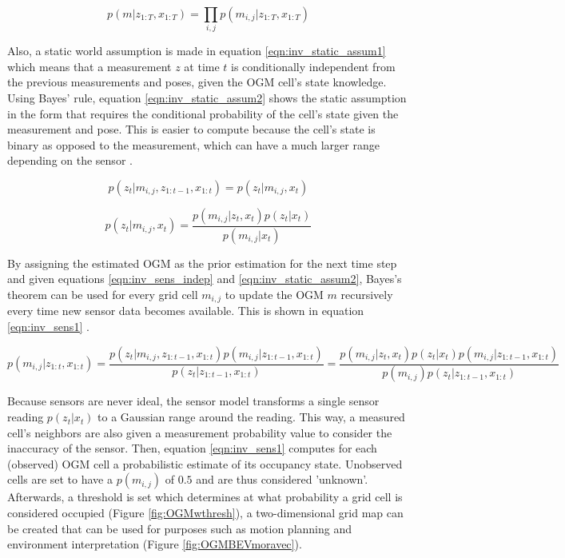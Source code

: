 \begin{equation} \label{eqn:inv_sens_indep}
	p(m|z_{1:T},x_{1:T}) = \prod_{i,j}^{} p(m_{i,j}|z_{1:T},x_{1:T}) 
\end{equation} 

Also, a static world assumption is made in equation \ref{eqn:inv_static_assum1} which means that a measurement $z$ at time $t$ is conditionally independent from the previous measurements and poses, given the \gls{OGM} cell's state knowledge. Using Bayes' rule, equation \ref{eqn:inv_static_assum2} shows the static assumption in the form that requires the conditional probability of the cell's state given the measurement and pose. This is easier to compute because the cell's state is binary as opposed to the measurement, which can have a much larger range depending on the sensor \cite{carvalho2013comparative}. 

\begin{equation} \label{eqn:inv_static_assum1}
	p(z_t|m_{i,j}, z_{1:t-1}, x_{1:t}) = p(z_t|m_{i,j}, x_t) 
\end{equation}

\begin{equation} \label{eqn:inv_static_assum2}
	p(z_t|m_{i,j}, x_t) = \frac{p(m_{i,j}|z_t, x_t)p(z_t|x_t)}{p(m_{i,j}| x_t)}
\end{equation}

By assigning the estimated \gls{OGM} as the prior estimation for the next time step and given equations \ref{eqn:inv_sens_indep} and \ref{eqn:inv_static_assum2}, Bayes's theorem can be used for every grid cell $m_{i,j}$ to update the \gls{OGM} $m$ recursively every time new sensor data becomes available. This is shown in equation \ref{eqn:inv_sens1} \cite{youtube2020ogm}. 


\begin{equation} \label{eqn:inv_sens1}
	p(m_{i,j}|z_{1:t},x_{1:t}) = \frac{p(z_t|m_{i,j},z_{1:t-1}, x_{1:t}) p(m_{i,j}|z_{1:t-1}, x_{1:t})}{p(z_t| z_{1:t-1}, x_{1:t})} = \frac{p(m_{i,j}|z_t, x_t)p(z_t|x_t) p(m_{i,j}|z_{1:t-1}, x_{1:t})}{p(m_{i,j})p(z_t| z_{1:t-1}, x_{1:t})}
\end{equation}

Because sensors are never ideal, the sensor model transforms a single sensor reading $p(z_t|x_t)$ to a Gaussian range around the reading. This way, a measured cell's neighbors are also given a measurement probability value to consider the inaccuracy of the sensor. Then, equation \ref{eqn:inv_sens1} computes for each (observed) \gls{OGM} cell a probabilistic estimate of its occupancy state.
Unobserved cells are set to have a $p(m_{i,j})$ of $0.5$ and are thus considered 'unknown'.
Afterwards, a threshold is set which determines at what probability a grid cell is considered occupied (Figure \ref{fig:OGMwthresh}), a two-dimensional grid map can be created that can be used for purposes such as motion planning and environment interpretation (Figure \ref{fig:OGMBEVmoravec}). \\	


